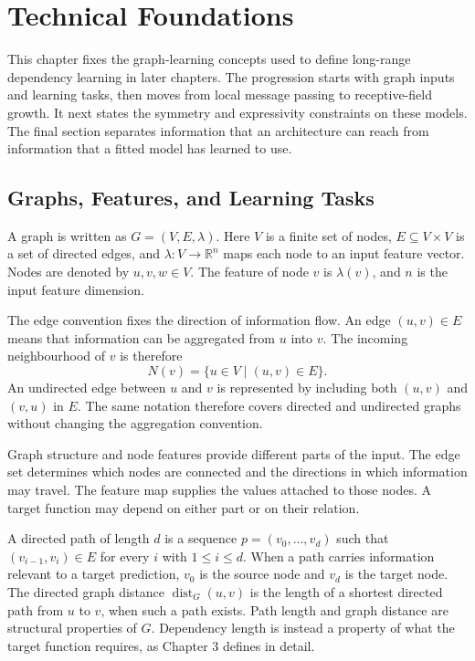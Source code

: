 \chapter{Technical Foundations}

This chapter fixes the graph-learning concepts used to define long-range dependency learning in later chapters.
The progression starts with graph inputs and learning tasks, then moves from local message passing to receptive-field growth.
It next states the symmetry and expressivity constraints on these models.
The final section separates information that an architecture can reach from information that a fitted model has learned to use.

\section{Graphs, Features, and Learning Tasks}

A graph is written as $G=(V,E,\lambda)$.
Here $V$ is a finite set of nodes, $E\subseteq V\times V$ is a set of directed edges, and $\lambda:V\to\mathbb{R}^{n}$ maps each node to an input feature vector.
Nodes are denoted by $u,v,w\in V$.
The feature of node $v$ is $\lambda(v)$, and $n$ is the input feature dimension.

The edge convention fixes the direction of information flow.
An edge $(u,v)\in E$ means that information can be aggregated from $u$ into $v$.
The incoming neighbourhood of $v$ is therefore
\[
N(v)=\{u\in V\mid (u,v)\in E\}.
\]
An undirected edge between $u$ and $v$ is represented by including both $(u,v)$ and $(v,u)$ in $E$.
The same notation therefore covers directed and undirected graphs without changing the aggregation convention.

Graph structure and node features provide different parts of the input.
The edge set determines which nodes are connected and the directions in which information may travel.
The feature map supplies the values attached to those nodes.
A target function may depend on either part or on their relation.

A directed path of length $d$ is a sequence $p=(v_0,\ldots,v_d)$ such that $(v_{i-1},v_i)\in E$ for every $i$ with $1\leq i\leq d$.
When a path carries information relevant to a target prediction, $v_0$ is the source node and $v_d$ is the target node.
The directed graph distance $\operatorname{dist}_G(u,v)$ is the length of a shortest directed path from $u$ to $v$, when such a path exists.
Path length and graph distance are structural properties of $G$.
Dependency length is instead a property of what the target function requires, as Chapter 3 defines in detail.


